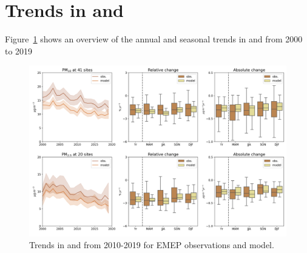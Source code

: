 \section{\label{sec:Trends_PM }Trends in \PM[10] and \PM[2.5] }

Figure~\ref{fig:pm_trends} shows an overview of the annual and seasonal trends in \PM[10]  and \PM[2.5] from 2000 to 2019


\begin{figure}
	\centering
	\includegraphics[width=0.74\paperwidth]{FIGS_TRENDS/PM_trends.png}
	\caption{\label{fig:pm_trends}Trends in \PM[10]  and \PM[2.5] from 2010-2019 for EMEP observations and model.}
\end{figure}



